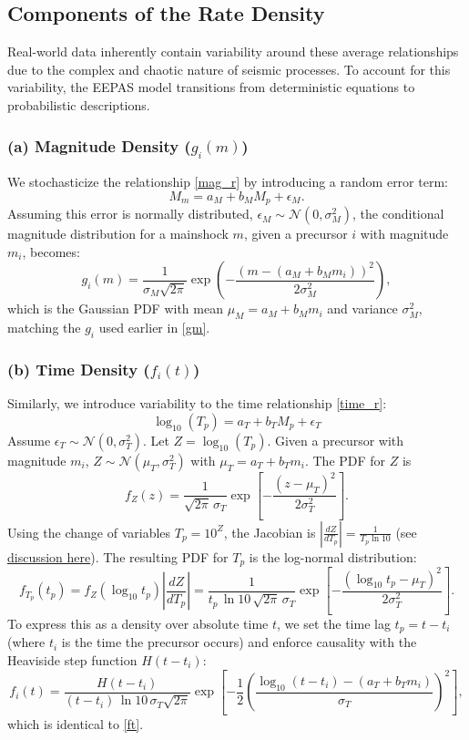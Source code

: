 \documentclass[extra,mreferee]{gji}
\theoremstyle{lemma}
\begin{document}
\subsection{Components of the Rate Density}

Real-world data inherently contain variability around these average relationships due to the complex and chaotic nature of seismic processes. To account for this variability, the EEPAS model transitions from deterministic equations to probabilistic descriptions.

\subsubsection{(a) Magnitude Density (\texorpdfstring{$g_i(m)$}{gi(m)})}

We stochasticize the relationship \eqref{mag_r} by introducing a random error term:
\[
M_m = a_M + b_M M_p + \epsilon_M.
\]
Assuming this error is normally distributed, $\epsilon_M \sim \mathcal{N}(0, \sigma_M^2)$, the conditional magnitude distribution for a mainshock \(m\), given a precursor \(i\) with magnitude \(m_i\), becomes:
\begin{equation}
g_i(m) = \frac{1}{\sigma_M \sqrt{2\pi}} \exp\!\left( -\frac{(m - (a_M + b_M m_i))^2}{2\sigma_M^2} \right),
\end{equation}
which is the Gaussian PDF with mean \(\mu_M = a_M + b_M m_i\) and variance \(\sigma_M^2\), matching the $g_i$ used earlier in \eqref{gm}.

\subsubsection{(b) Time Density (\texorpdfstring{$f_i(t)$}{fi(t)})}

Similarly, we introduce variability to the time relationship \eqref{time_r}:
\[
\log_{10}(T_p) = a_T + b_T M_p + \epsilon_T
\]
Assume $\epsilon_T \sim \mathcal{N}(0,\sigma_T^2)$. Let $Z = \log_{10}(T_p)$. Given a precursor with magnitude $m_i$, $Z \sim \mathcal{N}(\mu_T,\sigma_T^2)$ with $\mu_T = a_T+b_T m_i$. The PDF for $Z$ is
\[
f_Z(z) = \frac{1}{\sqrt{2\pi}\,\sigma_T}\exp\!\left[-\frac{(z-\mu_T)^2}{2\sigma_T^2}\right].
\]
Using the change of variables $T_p=10^{Z}$, the Jacobian is $\left|\frac{dZ}{dT_p}\right|=\frac{1}{T_p\ln 10}$ (see \href{https://en.wikipedia.org/wiki/Probability_density_function#Function_of_random_variables_and_change_of_variables_in_the_probability_density_function}{discussion here}). The resulting PDF for $T_p$ is the log-normal distribution:
\[
f_{T_p}(t_p) = f_Z(\log_{10} t_p) \left|\frac{dZ}{dT_p}\right| = \frac{1}{t_p\,\ln 10\,\sqrt{2\pi}\,\sigma_T}\exp\!\left[-\frac{(\log_{10} t_p-\mu_T)^2}{2\sigma_T^2}\right].
\]
To express this as a density over absolute time $t$, we set the time lag $t_p = t-t_i$ (where $t_i$ is the time the precursor occurs) and enforce causality with the Heaviside step function $H(t-t_i)$:
\begin{equation}
f_i(t) = \frac{H(t - t_i)}{(t - t_i)\,\ln 10\,\sigma_T \sqrt{2\pi}}
\exp\!\left[-\frac{1}{2}\left(\frac{\log_{10}(t - t_i) - (a_T + b_T m_i)}{\sigma_T}\right)^2\right],
\end{equation}
which is identical to \eqref{ft}.
\end{document}
